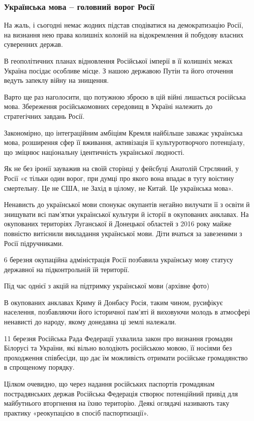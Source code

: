 \subsubsection{Українська мова – головний ворог Росії}

На жаль, і сьогодні немає жодних підстав сподіватися на демократизацію Росії,
на визнання нею права колишніх колоній на відокремлення й побудову власних
суверенних держав.

В геополітичних планах відновлення Російської імперії в її колишніх межах
Україна посідає особливе місце. З нашою державою Путін та його оточення ведуть
запеклу війну на знищення.

Варто ще раз наголосити, що потужною зброєю в цій війні лишається російська
мова. Збереження російськомовних середовищ в Україні належить до стратегічних
завдань Росії.

Закономірно, що інтеграційним амбіціям Кремля найбільше заважає українська
мова, розширення сфер її вживання, активізація її культуротворчого потенціалу,
що зміцнює національну ідентичність української людності.

Як не без іронії зауважив на своїй сторінці у фейсбуці Анатолій Стрєляний, у
Росії «є тільки один ворог, при думці про якого вона впадає в тугу воістину
смертельну. Це не США, не Захід в цілому, не Китай. Це українська мова».

Ненависть до української мови спонукає окупантів негайно вилучати її з освіти й
знищувати всі пам’ятки української культури й історії в окупованих анклавах. На
окупованих територіях Луганської й Донецької областей з 2016 року майже
повністю витіснили викладання української мови. Діти вчаться за завезеними з
Росії підручниками.

6 березня окупаційна адміністрація Росії позбавила українську мову статусу
державної на підконтрольній їй території.

Під час однієї з акцій на підтримку української мови (архівне фото)

В окупованих анклавах Криму й Донбасу Росія, таким чином, русифікує населення,
позбавляючи його історичної пам’яті й виховуючи молодь в атмосфері ненависті до
народу, якому донедавна ці землі належали.

11 березня Російська Рада Федерації ухвалила закон про визнання громадян
Білорусі та України, які вільно володіють російською мовою, її носіями без
проходження співбесіди, що дає їм можливість отримати російське громадянство в
спрощеному порядку.

Цілком очевидно, що через надання російських паспортів громадянам
пострадянських держав Російська Федерація створює потенційний привід для
майбутнього вторгнення на їхню територію. Деякі оглядачі називають таку
практику «реокупацією в спосіб паспортизації».

